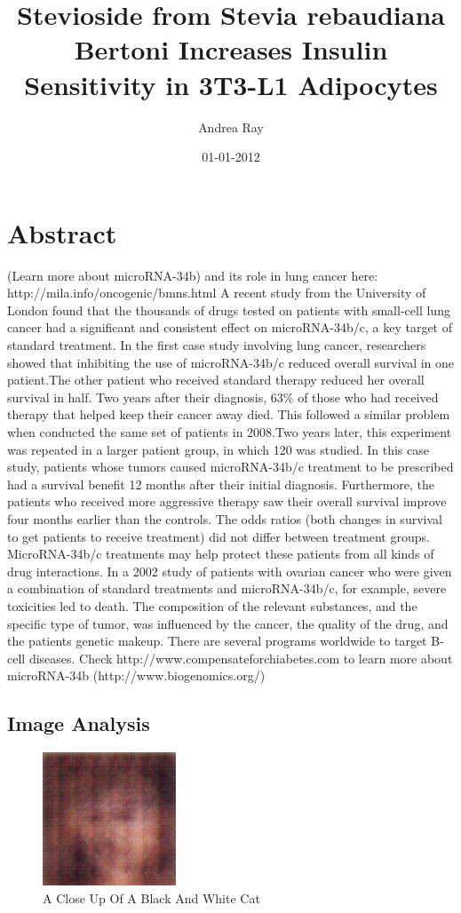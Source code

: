 \documentclass{article}%
\title{Stevioside from Stevia rebaudiana Bertoni Increases Insulin Sensitivity in 3T3{-}L1 Adipocytes}%
\author{Andrea Ray}%
\affil{Department of Genetics, Osaka University Medical School, 2{-}2 Yamada{-}oka, Suita, 565, Osaka, Japan}%
\date{01{-}01{-}2012}%
\begin{document}
%
\normalsize%
\maketitle%
\section{Abstract}%
\label{sec:Abstract}%
(Learn more about microRNA{-}34b) and its role in lung cancer here: http://mila.info/oncogenic/bmns.html\newline%
A recent study from the University of London found that the thousands of drugs tested on patients with small{-}cell lung cancer had a significant and consistent effect on microRNA{-}34b/c, a key target of standard treatment.\newline%
In the first case study involving lung cancer, researchers showed that inhibiting the use of microRNA{-}34b/c reduced overall survival in one patient.The other patient who received standard therapy reduced her overall survival in half. Two years after their diagnosis, 63\% of those who had received therapy that helped keep their cancer away died. This followed a similar problem when conducted the same set of patients in 2008.Two years later, this experiment was repeated in a larger patient group, in which 120 was studied. In this case study, patients whose tumors caused microRNA{-}34b/c treatment to be prescribed had a survival benefit 12 months after their initial diagnosis. Furthermore, the patients who received more aggressive therapy saw their overall survival improve four months earlier than the controls. The odds ratios (both changes in survival to get patients to receive treatment) did not differ between treatment groups.\newline%
MicroRNA{-}34b/c treatments may help protect these patients from all kinds of drug interactions. In a 2002 study of patients with ovarian cancer who were given a combination of standard treatments and microRNA{-}34b/c, for example, severe toxicities led to death. The composition of the relevant substances, and the specific type of tumor, was influenced by the cancer, the quality of the drug, and the patients genetic makeup.\newline%
There are several programs worldwide to target B{-}cell diseases. Check http://www.compensateforchiabetes.com to learn more about microRNA{-}34b (http://www.biogenomics.org/)

%
\subsection{Image Analysis}%
\label{subsec:ImageAnalysis}%


\begin{figure}[h!]%
\centering%
\includegraphics[width=150px]{500_fake_images/samples_5_42.png}%
\caption{A Close Up Of A Black And White Cat}%
\end{figure}

%
\end{document}
